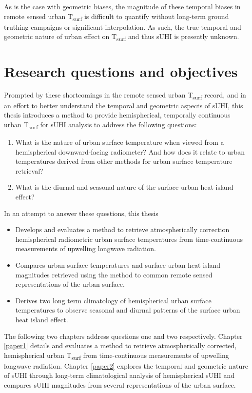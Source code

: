 \begin{bibunit}
As is the case with geometric biases, the magnitude of these temporal biases in remote sensed urban T\textsubscript{surf} is difficult to quantify without long-term ground truthing campaigns or significant interpolation. As such, the true temporal and geometric nature of urban effect on T\textsubscript{surf} and thus sUHI is presently unknown.
 
\section{Research questions and objectives}

Prompted by these shortcomings in the remote sensed urban T\textsubscript{surf} record, and in an effort to better understand the temporal and geometric aspects of sUHI, this thesis introduces a method to provide hemispherical, temporally continuous urban T\textsubscript{surf} for sUHI analysis to address the following questions:

\begin{enumerate}
	\item What is the nature of urban surface temperature when viewed from a hemispherical downward-facing radiometer? And how does it relate to urban temperatures derived from other methods for urban surface temperature retrieval?
	\item What is the diurnal and seasonal nature of the surface urban heat island effect?
\end{enumerate}

\noindent In an attempt to answer these questions, this thesis

\begin{itemize}
	\item Develops and evaluates a method to retrieve atmospherically correction hemispherical radiometric urban surface temperatures from time-continuous measurements of upwelling longwave radiation.
	\item Compares urban surface temperatures and surface urban heat island magnitudes retrieved using the method to common remote sensed representations of the urban surface.
	\item Derives two long term climatology of hemispherical urban surface temperatures to observe seasonal and diurnal patterns of the surface urban heat island effect.
\end{itemize}

The following two chapters address questions one and two respectively. Chapter \ref{paper1} details and evaluates a method to retrieve atmospherically corrected, hemispherical urban T\textsubscript{surf} from time-continuous measurements of upwelling longwave radiation. Chapter \ref{paper2} explores the temporal and geometric nature of sUHI through long-term climatological analysis of hemispherical sUHI and compares sUHI magnitudes from several representations of the urban surface.


\cleardoublepage 
{}  
\renewcommand*{\bibname}{References}

\putbib
\end{bibunit}